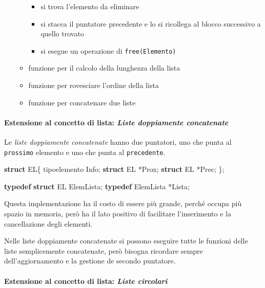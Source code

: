 \documentclass[
]{article}
\newenvironment{Shaded}{}{}
\newcommand{\KeywordTok}[1]{\textcolor[rgb]{0.00,0.44,0.13}{\textbf{#1}}}
\newcommand{\NormalTok}[1]{#1}
\begin{document}
\begin{itemize}
\begin{itemize}
    \begin{itemize}
    \item
      si trova l'elemento da eliminare
    \item
      si stacca il puntatore precedente e lo si ricollega al blocco
      successivo a quello trovato
    \item
      si esegue un operazione di \texttt{free(Elemento)}
    \end{itemize}
  \item
    funzione per il calcolo della lunghezza della lista
  \item
    funzione per rovesciare l'ordine della lista
  \item
    funzione per concatenare due liste
  \end{itemize}
\end{itemize}

\hypertarget{header-n1295}{%
\paragraph{\texorpdfstring{Estensione al concetto di lista: \emph{Liste
doppiamente
concatenate}}{Estensione al concetto di lista: Liste doppiamente concatenate}}\label{header-n1295}}

Le \emph{liste doppiamente concatenate} hanno due puntatori, uno che
punta al \texttt{prossimo} elemento e uno che punta al
\texttt{precedente}.

\begin{Shaded}
\begin{Highlighting}[]
\KeywordTok{struct}\NormalTok{ EL\{}
\NormalTok{	tipoelemento Info;}
	\KeywordTok{struct}\NormalTok{ EL *Prox;}
	\KeywordTok{struct}\NormalTok{ EL *Prec;}
\NormalTok{\}; }

\KeywordTok{typedef} \KeywordTok{struct}\NormalTok{ EL ElemLista;}
\KeywordTok{typedef}\NormalTok{ ElemLista *Lista;}
\end{Highlighting}
\end{Shaded}

Questa implementazione ha il costo di essere più grande, perché occupa
più spazio in memoria, però ha il lato positivo di facilitare
l'inserimento e la cancellazione degli elementi.

Nelle liste doppiamente concatenate si possono eseguire tutte le
funzioni delle liste semplicemente concatenate, però bisogna ricordare
sempre dell'aggiornamento e la gestione de secondo puntatore.

\hypertarget{header-n1301}{%
\paragraph{\texorpdfstring{Estensione al concetto di lista: \emph{Liste
circolari}}{Estensione al concetto di lista: Liste circolari}}\label{header-n1301}}
\end{document}
